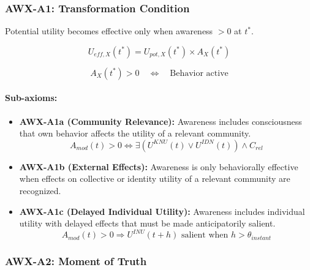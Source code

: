 \subsubsection{AWX-A1: Transformation Condition}

\begin{axiom}
\label{ax:awx-a1}
Potential utility becomes effective only when awareness $> 0$ at $t^*$.
\end{axiom}

\begin{equation}
U_{eff,X}(t^*) = U_{pot,X}(t^*) \times A_X(t^*)
\end{equation}

\begin{equation}
A_X(t^*) > 0 \quad \Leftrightarrow \quad \text{Behavior active}
\end{equation}

\paragraph{Sub-axioms:}

\begin{itemize}
\item \textbf{AWX-A1a (Community Relevance):} Awareness includes consciousness 
that own behavior affects the utility of a relevant community.
\begin{equation}
A_{mod}(t) > 0 \Leftrightarrow \exists (U^{KNU}(t) \vee U^{IDN}(t)) \wedge C_{rel}
\end{equation}

\item \textbf{AWX-A1b (External Effects):} Awareness is only behaviorally effective
when effects on collective or identity utility of a relevant community are recognized.

\item \textbf{AWX-A1c (Delayed Individual Utility):} Awareness includes individual
utility with delayed effects that must be made anticipatorily salient.
\begin{equation}
A_{mod}(t) > 0 \Rightarrow U^{INU}(t+h) \text{ salient when } h > \theta_{instant}
\end{equation}
\end{itemize}

\subsubsection{AWX-A2: Moment of Truth}

